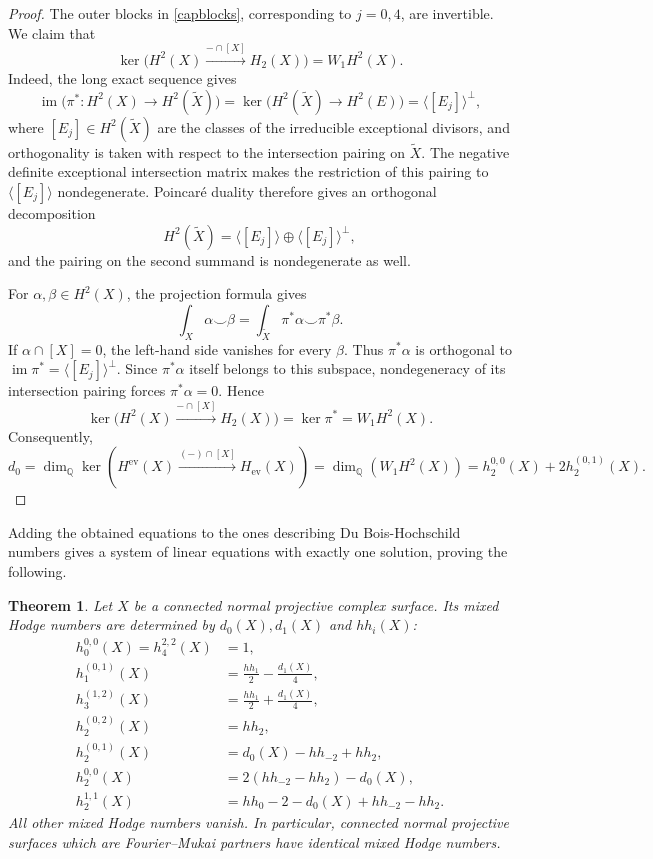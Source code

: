 \documentclass{amsart}
\theoremstyle{plain}
\newtheorem{theorem}[prop]{Theorem}
\theoremstyle{definition}
\newcommand{\bbQ}{\mathbb{Q}}
\begin{document}
\begin{proof}
The outer blocks in \eqref{capblocks}, corresponding to $j=0,4$, are invertible. We claim that
\[
\ker\bigl(H^2(X)\xrightarrow{-\cap[X]}H_2(X)\bigr)
=W_1H^2(X).
\]
Indeed, the long exact sequence gives 
\[
\operatorname{im}\bigl(\pi^*:H^2(X)\to H^2(\widetilde X)\bigr)
=
\ker\bigl(H^2(\widetilde X)\to H^2(E)\bigr)
=
\langle[E_j]\rangle^\perp,
\]
where $[E_j]\in H^2(\widetilde X)$ are the classes of the irreducible exceptional divisors, and orthogonality is taken with respect to the intersection pairing on $\widetilde X$. The negative definite exceptional intersection matrix makes the restriction of this pairing to
$\langle[E_j]\rangle$ nondegenerate.
Poincar\'e duality therefore gives an orthogonal decomposition
\[
H^2(\widetilde X)
=
\langle[E_j]\rangle
\oplus
\langle[E_j]\rangle^\perp,
\]
and the pairing on the second summand is nondegenerate as well.

For $\alpha,\beta\in H^2(X)$, the projection formula gives
\[
\int_X\alpha\smile\beta
=
\int_{\widetilde X}\pi^*\alpha\smile\pi^*\beta.
\]
If $\alpha\cap[X]=0$, the left-hand side vanishes for every $\beta$.
Thus $\pi^*\alpha$ is orthogonal to
$\operatorname{im}\pi^*=\langle[E_j]\rangle^\perp$.
Since $\pi^*\alpha$ itself belongs to this subspace, nondegeneracy of its intersection pairing forces
$\pi^*\alpha=0$. Hence
\[
\ker\bigl(H^2(X)\xrightarrow{-\cap[X]}H_2(X)\bigr) = \ker\pi^* = W_1H^2(X).
\]
Consequently,
\[
d_0=\dim_\bbQ\ker(H^{\mathrm{ev}}(X)\xrightarrow{(-)\cap[X]} H_{\mathrm{ev}}(X))=\dim_\bbQ(W_1H^2(X))=h_2^{0,0}(X)+2h_2^{(0,1)}(X).
\]
\end{proof}

Adding the obtained equations
to the ones describing Du Bois-Hochschild numbers gives a system of linear equations with exactly one solution, proving the following.

\begin{theorem}\label{thmnormalsurfacereconstruction}
Let $X$ be a connected normal projective complex surface. Its mixed Hodge numbers are determined by $d_0(X),d_1(X)$ and $hh_i(X)$:
\begin{equation}\label{eqnormalsurfaceinversion}
\begin{aligned}
h_0^{0,0}(X)=h_4^{2,2}(X)&=1,\\
h_1^{(0,1)}(X)&=\frac{hh_1}{2}-\frac{d_1(X)}{4},\\
h_3^{(1,2)}(X)&=\frac{hh_1}{2}+\frac{d_1(X)}{4},\\
h_2^{(0,2)}(X)&=hh_2,\\
h_2^{(0,1)}(X)&=d_0(X)-hh_{-2}+hh_2,\\
h_2^{0,0}(X)&=2(hh_{-2}-hh_2)-d_0(X),\\
h_2^{1,1}(X)&=hh_0-2-d_0(X)+hh_{-2}-hh_2.
\end{aligned}
\end{equation}
All other mixed Hodge numbers vanish. In particular, connected normal projective surfaces which are Fourier--Mukai partners have identical mixed Hodge numbers.
\end{theorem}
\end{document}
